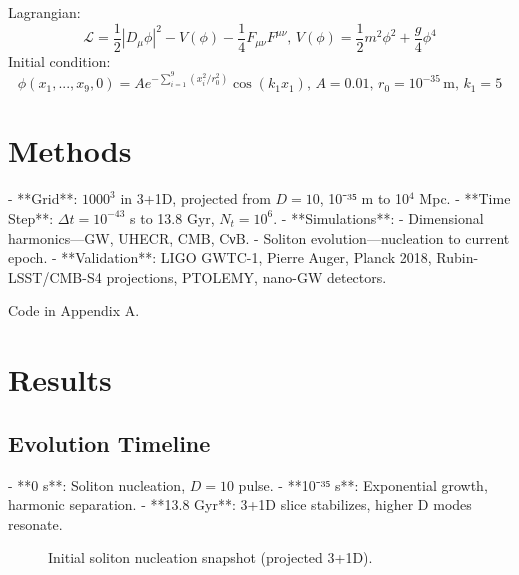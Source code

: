 \documentclass[11pt]{article}
\begin{document}
Lagrangian:
\begin{equation}
\mathcal{L} = \frac{1}{2} |D_\mu \phi|^2 - V(\phi) - \frac{1}{4} F_{\mu \nu} F^{\mu \nu}, \, V(\phi) = \frac{1}{2} m^2 \phi^2 + \frac{g}{4} \phi^4
\end{equation}
Initial condition:
\begin{equation}
\phi(x_1, ..., x_9, 0) = A e^{-\sum_{i=1}^{9} (x_i^2 / r_0^2)} \cos(k_1 x_1), \, A = 0.01, \, r_0 = 10^{-35} \, \text{m}, \, k_1 = 5
\end{equation}

\section{Methods}
- **Grid**: \(1000^3\) in 3+1D, projected from \(D = 10\), 10⁻³⁵ m to 10$^4$ Mpc.
- **Time Step**: \(\Delta t = 10^{-43}\) s to 13.8 Gyr, \(N_t = 10^6\).
- **Simulations**: 
  - Dimensional harmonics—GW, UHECR, CMB, CνB.
  - Soliton evolution—nucleation to current epoch.
- **Validation**: LIGO GWTC-1, Pierre Auger, Planck 2018, Rubin-LSST/CMB-S4 projections, PTOLEMY, nano-GW detectors.

Code in Appendix A.

\section{Results}
\subsection{Evolution Timeline}
- **0 s**: Soliton nucleation, \(D = 10\) pulse.
- **10⁻³⁵ s**: Exponential growth, harmonic separation.
- **13.8 Gyr**: 3+1D slice stabilizes, higher D modes resonate.

\begin{figure}[h]
    \centering
    \caption{Initial soliton nucleation snapshot (projected 3+1D).}
    \label{fig:nucleation}
\end{figure}
\end{document}
